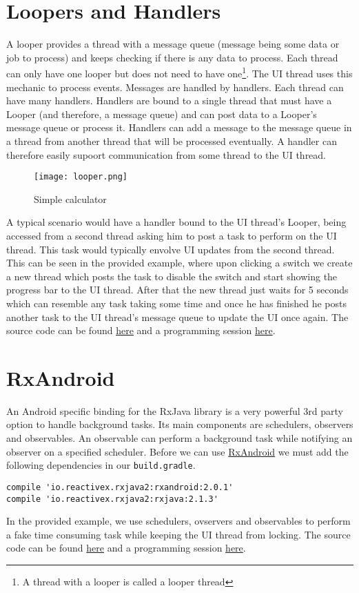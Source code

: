 \section{Loopers and Handlers}
A looper provides a thread with a message queue (message being some data or job to process) and keeps checking if there is any data to process. Each thread can only have one looper but does not need to have one\footnote{A thread with a looper is called a looper thread}. The UI thread uses this mechanic to process events. Messages are handled by handlers. Each thread can have many handlers. Handlers are bound to a single thread that must have a Looper (and therefore, a message queue) and can post data to a Looper's message queue or process it. Handlers can add a message to the message queue in a thread from another thread that will be processed eventually. A handler can therefore easily supoort communication from some thread to the UI thread.

\begin{figure}[H]
\centering
\texttt{[image: looper.png]}
\caption{Simple calculator}
\label{fig:simcal}
\end{figure}

A typical scenario would have a handler bound to the UI thread's Looper, being accessed from a second thread asking him to post a task to perform on the UI thread. This task would typically envolve UI updates from the second thread. This can be seen in the provided example, where upon clicking a switch we create a new thread which posts the task to disable the switch and start showing the progress bar to the UI thread. After that the new thread just waits for 5 seconds which can resemble any task taking some time and once he has finished he posts another task to the UI thread's message queue to update the UI once again. The source code can be found \href{https://github.com/JonSteinn/AndroidDevelopment/tree/master/examples/lab2/handlers}{here} and a programming session \href{https://youtu.be/__e-C97P6Eo}{here}.

\section{RxAndroid}
An Android specific binding for the RxJava library is a very powerful 3rd party option to handle background tasks. Its main components are schedulers, observers and observables. An observable can perform a background task while notifying an observer on a specified scheduler. Before we can use \href{https://github.com/ReactiveX/RxAndroid}{RxAndroid} we must add the following dependencies in our \texttt{build.gradle}.
\begin{lstlisting}[style=A_txt]
compile 'io.reactivex.rxjava2:rxandroid:2.0.1'
compile 'io.reactivex.rxjava2:rxjava:2.1.3'
\end{lstlisting}
In the provided example, we use schedulers, ovservers and observables to perform a fake time consuming task while keeping the UI thread from locking. The source code can be found \href{https://github.com/JonSteinn/AndroidDevelopment/tree/master/examples/lab2/rxandroid}{here} and a programming session \href{https://youtu.be/aSyy4MGnmQ4}{here}.


